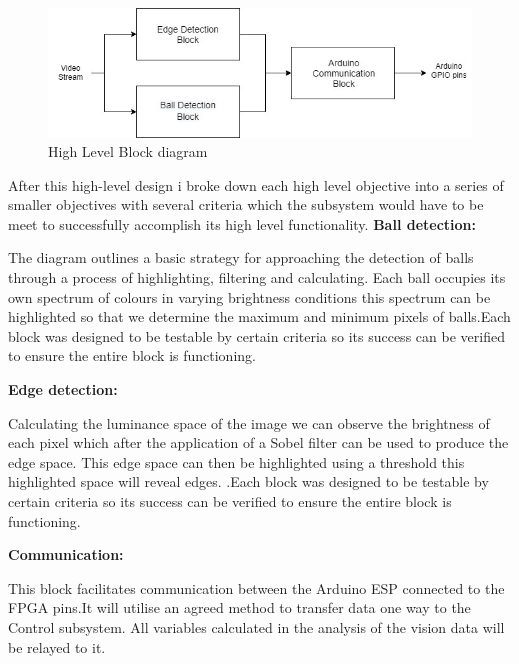 \documentclass[10pt,twoside]{article}
\begin{document}
\begin{figure}[hbt!]
    \centering
    \includegraphics[scale=0.35]{HighLevelDesign.jpg}
    \captionsetup{justification=centering}
    \caption{High Level Block diagram}
\end{figure}

\smallbreak
After this high-level design i broke down each high level objective into a series of smaller objectives with several criteria which the subsystem would have to be meet to successfully accomplish its high level functionality. 
\smallbreak
\textbf{Ball detection:}

The diagram outlines a basic strategy for approaching the detection of balls through a process of highlighting, filtering and calculating. Each  ball occupies its own spectrum of colours in varying brightness conditions this spectrum can be highlighted so that we determine the maximum and minimum pixels of balls.Each block was designed to be testable by certain criteria so its success can be verified to ensure the entire block is functioning. 

\textbf{Edge detection:}

Calculating the luminance space of the image we can observe the brightness of each pixel which after the
application of a Sobel filter can be used to produce the edge space. This edge space can then be highlighted
using a threshold this highlighted space will reveal edges. .Each block was designed to be testable by certain
criteria so its success can be verified to ensure the entire block is functioning.

\textbf{Communication:}

This block facilitates communication between the Arduino ESP connected to the FPGA pins.It will utilise an agreed method to transfer data one way to the Control subsystem. All variables calculated in the analysis of the vision data will be relayed to it.
\end{document}
